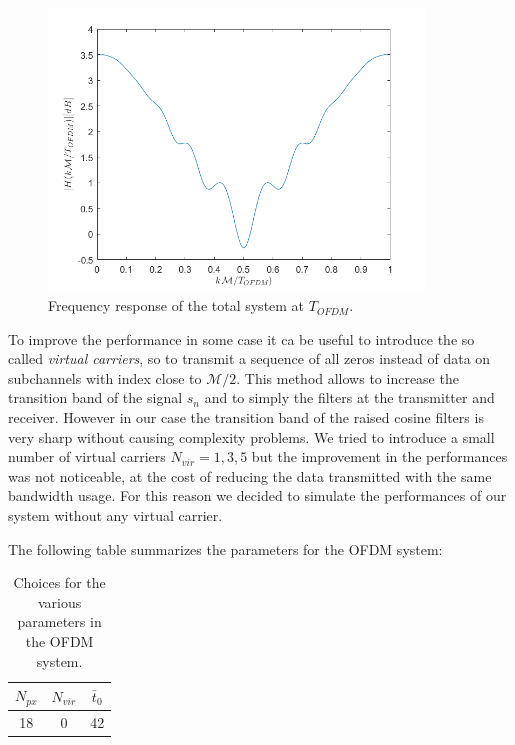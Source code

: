 \documentclass[a4paper,11.5pt]{article}
\begin{document}
\begin{figure}[H]
	\begin{center}   
		\includegraphics[width=10cm]{figs/H_mag.png} 
		\caption{Frequency response of the total system at $T_{OFDM}$.}
		\label{fig:H}
	\end{center}
\end{figure}


To improve the performance in some case it ca be useful to introduce the so called \emph{virtual carriers}, so to transmit a sequence of all zeros instead of data on subchannels with index close to $\mathcal{M}/2$. This method allows to increase the transition band of the signal $s_n$ and to simply the filters at the transmitter and receiver. However in our case the transition band of the raised cosine filters is very sharp without causing complexity problems. We tried to introduce a small number of virtual carriers $N_{vir} = 1,3,5$ but the improvement in the performances was not noticeable, at the cost of reducing the data transmitted with the same bandwidth usage. For this reason we decided to simulate the performances of our system without any virtual carrier.

The following table summarizes the parameters for the OFDM system:

\begin{table}[htbp]
	\begin{center}
		\begin{tabular}{ccc}
			\toprule
			$N_{px}$ & $N_{vir}$ &$\bar{t}_0$ \\
			\midrule
			18 & 0 & 42 \\
			\bottomrule
		\end{tabular}
	\end{center}
	\label{tab:sumup2}
	\caption{Choices for the various parameters in the OFDM system.}
\end{table} 
\end{document}
